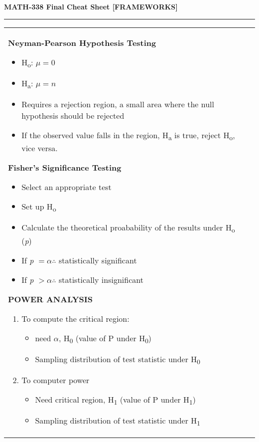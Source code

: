\documentclass[6pt]{article}
\newcommand{\HL}{\par\noindent\rule{\textwidth}{0.4pt}}
\begin{document}
\begin{scriptsize}

\begin{center}
\textbf{MATH-338 Final Cheat Sheet [FRAMEWORKS]}
\end{center}

\HL

\begin{tabular}{l | l}

\parbox{0.45\textwidth}{

\begin{flushleft}
\textbf{Neyman-Pearson Hypothesis Testing}
\end{flushleft}

\begin{itemize}
\item H\textsubscript{o}: $\mu = 0$
\item H\textsubscript{a}: $\mu = n$
\item Requires a rejection region, a small area where the null hypothesis should be rejected
\item If the observed value falls in the region, H\textsubscript{a} is true, reject H\textsubscript{o}, vice versa.
\end{itemize}

\begin{flushleft}
\textbf{Fisher's Significance Testing}
\end{flushleft}

\begin{itemize}
\item Select an appropriate test
\item Set up H\textsubscript{o}
\item Calculate the theoretical proabability of the results under H\textsubscript{o} (\emph{p})
\item If \emph{p} $= \alpha \therefore$ statistically significant
\item If \emph{p} $> \alpha \therefore$ statistically insignificant
\end{itemize}

\begin{flushleft}
\textbf{POWER ANALYSIS}
\end{flushleft}

\begin{enumerate}
\item To compute the critical region:
\begin{itemize}
\item need $\alpha$, H\textsubscript{0} (value of P under H\textsubscript{0})
\item Sampling distribution of test statistic under H\textsubscript{0}
\end{itemize}
\item To computer power
\begin{itemize}
\item Need critical region, H\textsubscript{1} (value of P under H\textsubscript{1})
\item Sampling distribution of test statistic under H\textsubscript{1}
\end{itemize}
\end{enumerate}
}


\end{tabular}
\end{scriptsize}
\end{document}
